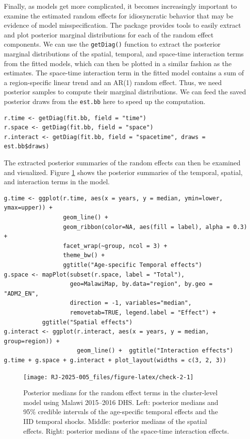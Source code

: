 Finally, as models get more complicated, it becomes increasingly important to examine the estimated random effects for idiosyncratic behavior that may be evidence of model misspecification. The  package provides tools to easily extract and plot posterior marginal distributions for each of the random effect components. We can use the \texttt{getDiag()} function to extract the posterior marginal distributions of the spatial, temporal, and space-time interaction terms from the fitted models, which can then be plotted in a similar fashion as the estimates. The space-time interaction term in the fitted model contains a sum of a region-specific linear trend and an AR(1) random effect. Thus, we need posterior samples to compute their marginal distributions. We can feed the saved posterior draws from the \texttt{est.bb} here to speed up the computation.

\begin{verbatim}
r.time <- getDiag(fit.bb, field = "time")
r.space <- getDiag(fit.bb, field = "space")
r.interact <- getDiag(fit.bb, field = "spacetime", draws = est.bb$draws)
\end{verbatim}

The extracted posterior summaries of the random effects can then be examined and visualized. Figure \ref{fig:check-2} shows the posterior summaries of the temporal, spatial, and interaction terms in the model.

\begin{verbatim}
g.time <- ggplot(r.time, aes(x = years, y = median, ymin=lower, ymax=upper)) + 
                 geom_line() + 
                 geom_ribbon(color=NA, aes(fill = label), alpha = 0.3) +
                 facet_wrap(~group, ncol = 3) + 
                 theme_bw() + 
                 ggtitle("Age-specific Temporal effects")
g.space <- mapPlot(subset(r.space, label = "Total"), 
                   geo=MalawiMap, by.data="region", by.geo = "ADM2_EN", 
                   direction = -1, variables="median", 
                   removetab=TRUE, legend.label = "Effect") + 
           ggtitle("Spatial effects") 
g.interact <- ggplot(r.interact, aes(x = years, y = median, group=region)) + 
                     geom_line() +  ggtitle("Interaction effects") 
g.time + g.space + g.interact + plot_layout(widths = c(3, 2, 3)) 
\end{verbatim}

\begin{figure}[!ht]
\texttt{[image: RJ-2025-005\_files/figure-latex/check-2-1]} \caption{Posterior medians for the random effect terms in the cluster-level model using Malawi 2015--2016 DHS. Left: posterior medians and 95\% credible intervals of the age-specific temporal effects and the IID temporal shocks. Middle: posterior medians of the spatial effects. Right: posterior medians of the space-time interaction effects.}\label{fig:check-2}
\end{figure}

